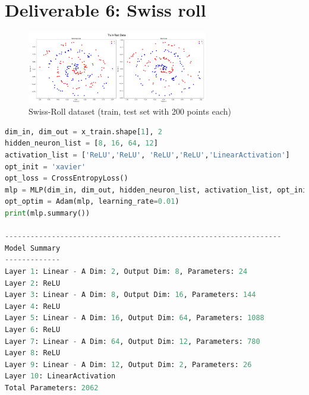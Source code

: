 
\section{Deliverable 6: Swiss roll}


\begin{solve}    

\begin{figure}[H]
    \centering
    \includegraphics[width=0.7\textwidth]{plots/6_train_test_swiss-roll.png}
    \caption{Swiss-Roll dataset (train, test set with 200 points each)}
\end{figure}


\begin{lstlisting}[language=python]
dim_in, dim_out = x_train.shape[1], 2
hidden_neuron_list = [8, 16, 64, 12]
activation_list = ['ReLU','ReLU', 'ReLU','ReLU','LinearActivation']
opt_init = 'xavier'
opt_loss = CrossEntropyLoss()
mlp = MLP(dim_in, dim_out, hidden_neuron_list, activation_list, opt_init)
opt_optim = Adam(mlp, learning_rate=0.01)
print(mlp.summary())
    
-----------------------------------------------------------------
Model Summary
-------------
Layer 1: Linear - A Dim: 2, Output Dim: 8, Parameters: 24
Layer 2: ReLU
Layer 3: Linear - A Dim: 8, Output Dim: 16, Parameters: 144
Layer 4: ReLU
Layer 5: Linear - A Dim: 16, Output Dim: 64, Parameters: 1088
Layer 6: ReLU
Layer 7: Linear - A Dim: 64, Output Dim: 12, Parameters: 780
Layer 8: ReLU
Layer 9: Linear - A Dim: 12, Output Dim: 2, Parameters: 26
Layer 10: LinearActivation
Total Parameters: 2062
\end{lstlisting}


\end{solve}
